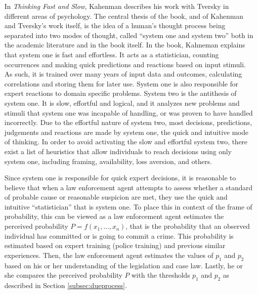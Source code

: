 \documentclass[12pt]{article} %
\begin{document}
In \textit{Thinking Fast and Slow}, Kahenman describes his work with Tversky in different areas of psychology. The central thesis of the book, and of Kahenman and Tversky's work itself, is the idea of a human's thought process being separated into two modes of thought, called ``system one and system two'' both in the academic literature and in the book itself. In the book, Kahneman explains that system one is fast and effortless. It acts as a statistician, counting occurrences and making quick predictions and reactions based on input stimuli. As such, it is trained over many years of input data and outcomes, calculating correlations and storing them for later use. System one is also responsible for expert reactions to domain specific problems. System two is the antithesis of system one. It is slow, effortful and logical, and it analyzes new problems and stimuli that system one was incapable of handling, or was proven to have handled incorrectly. Due to the effortful nature of system two, most decisions, predictions, judgements and reactions are made by system one, the quick and intuitive mode of thinking. In order to avoid activating the slow and effortful system two, there exist a list of heuristics that allow individuals to reach decisions using only system one, including framing, availability, loss aversion, and others.

Since system one is responsible for quick expert decisions, it is reasonable to believe that when a law enforcement agent attempts to assess whether a standard of probable cause or reasonable suspicion are met, they use the quick and intuitive ``statistician'' that is system one. To place this in context of the frame of probability, this can be viewed as a law enforcement agent estimates the perceived probability $P = f(x_1,...,x_n)$, that is the probability that an observed individual has committed or is going to commit a crime. This probability is estimated based on expert training (police training) and previous similar experiences. Then, the law enforcement agent estimates the values of $p_1$ and $p_2$ based on his or her understanding of the legislation and case law. Lastly, he or she compares the perceived probability $P$ with the thresholds $p_1$ and $p_2$ as described in Section \ref{subsec:dueprocess}.

\end{document}
